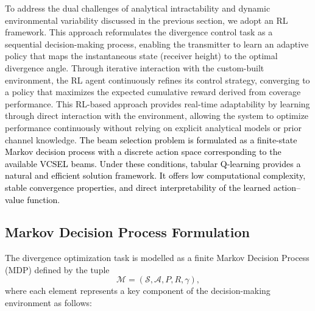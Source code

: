 \documentclass[twocolumn,twoside]{IEEEtran}
\theoremstyle{break}
\begin{document}
To address the dual challenges of analytical intractability and dynamic environmental variability discussed in the previous section, we adopt an RL framework. This approach reformulates the divergence control task as a sequential decision-making process, enabling the transmitter to learn an adaptive policy that maps the instantaneous state (receiver height) to the optimal divergence angle. Through iterative interaction with the custom-built environment, the RL agent continuously refines its control strategy, converging to a policy that maximizes the expected cumulative reward derived from coverage performance. This RL-based approach provides real-time adaptability by learning through direct interaction with the environment, allowing the system to optimize performance continuously without relying on explicit analytical models or prior channel knowledge. \textcolor{black}{The beam selection problem is formulated as a finite-state Markov decision process with a discrete action space corresponding to the available VCSEL beams. Under these conditions, tabular Q-learning provides a natural and efficient solution framework. It offers low computational complexity, stable convergence properties, and direct interpretability of the learned action–value function.}


\subsection{Markov Decision Process Formulation}

The divergence optimization task is modelled as a finite Markov Decision Process (MDP) defined by the tuple
\begin{equation}
	\mathcal{M} = (\mathcal{S}, \mathcal{A}, P, R, \gamma),
\end{equation}
where each element represents a key component of the decision-making environment as follows:
\end{document}
